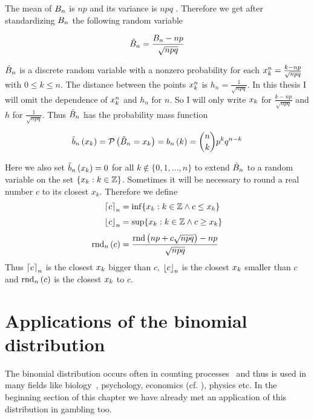 
The mean of $\Bs[n]$ is $np$ and its variance is $npq$ \cite[p. 112]{georgii}\cite[pp. 8-9]{fels}\cite{wiki:binomial_distribution}. Therefore we get after standardizing $\Bs[n]$ the following random variable

\begin{align}
  \BBs[n] = \frac{\Bs[n]-np}{\sqrt{npq}}
\end{align}

$\BBs$ is a discrete random variable with a nonzero probability for each $\x[k]^n = \frac{k-np}{\sqrt{npq}}$ with $0\le k\le n$. The distance between the points $\x[k]^n$  is $h_n = \frac{1}{\sqrt{npq}}$. In this thesis I will omit the dependence of $\x^n$ and $h_n$ for $n$. So I will only write $\x$ for $\frac{k-np}{\sqrt{npq}}$ and $h$ for $\frac 1{\sqrt{npq}}$. Thus $\BBs$ has the probability mass function

\begin{align}
  \bb{\x[k]} = \P{\BBs = \x[k]} = \b{k} = \binom nk p^kq^{n-k}
\end{align}

Here we also set $\bb{\x[k]}=0$ for all $k\notin\{0,1,\ldots,n\}$ to extend $\BBs$ to a random variable on the set $\{\x[k] : k\in\Z\}$. Sometimes it will be necessary to round a real number $c$ to its closest $x_k$. Therefore we define
\begin{align}
  \xup{c} &= \inf \{ x_k : k\in\Z \land c \le x_k \} \nl
  \xdown{c} &= \sup \{ x_k : k \in \Z \land c \ge x_k \} \nl
  \xrnd{c} &= \frac{\rnd{np+c\sqrt{npq}}-np}{\sqrt{npq}}
\end{align}
Thus $\xup{c}$ is the closest $\x$ bigger than $c$, $\xdown{c}$ is the closest $\x$ smaller than $c$ and $\xrnd{c}$ is the closest $\x$ to $c$.

\section{Applications of the binomial distribution}

The binomial distribution occurs often in counting processes~\cite[p. 138]{henze} and thus is used in many fields like biology~\cite[p. 146]{henze}, psychology, economics (cf. \cite[p. 59]{irle}), physics etc. In the beginning section of this chapter we have already met an application of this distribution in gambling too.


